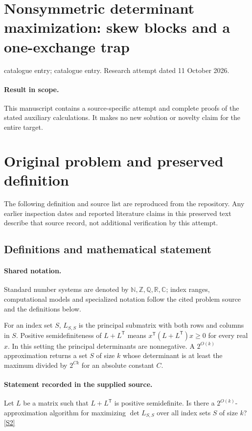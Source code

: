 \documentclass[11pt]{article}
\begin{document}
\section*{Nonsymmetric determinant maximization: skew blocks and a one-exchange trap}
\noindent catalogue entry; catalogue entry. Research attempt dated 11 October 2026.
\paragraph{Result in scope.}This manuscript contains a source-specific attempt and complete proofs of the stated auxiliary calculations. It makes no new solution or novelty claim for the entire target.
\section{Original problem and preserved definition}
The following definition and source list are reproduced from the repository. Any earlier inspection dates and reported literature claims in this preserved text describe that source record, not additional verification by this attempt.
\subsection{Definitions and mathematical statement}

\paragraph{Shared notation.}Standard number systems are denoted by $\mathbb N,\mathbb Z,\mathbb Q,\mathbb R,\mathbb C$; index ranges, computational models and specialized notation follow the cited problem source and the definitions below.


For an index set $S$, $L_{S,S}$ is the principal submatrix with both rows and columns in $S$. Positive semidefiniteness of $L+L^{\mathsf T}$ means $x^{\mathsf T}(L+L^{\mathsf T})x\geq0$ for every real $x$. In this setting the principal determinants are nonnegative. A $2^{O(k)}$ approximation returns a set $S$ of size $k$ whose determinant is at least the maximum divided by $2^{Ck}$ for an absolute constant $C$.
\paragraph{Statement recorded in the supplied source.}
Let $L$ be a matrix such that $L+L^\mathsf T$ is positive semidefinite. Is there a $2^{O(k)}$-approximation algorithm for maximizing $\det L_{S,S}$ over all index sets $S$ of size $k$? \href{https://doi.org/10.4171/owr/2021/53}{[S2]}
\end{document}
